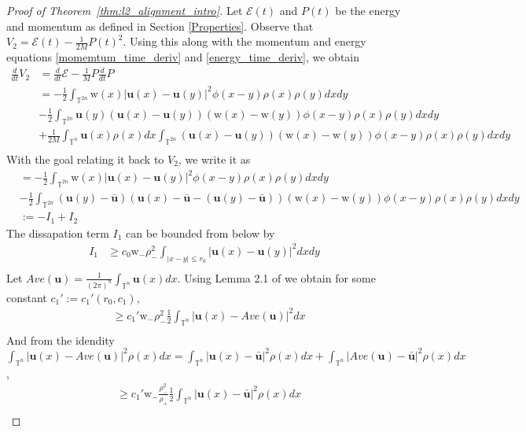 \documentclass[11pt,letterpaper]{amsart}
\theoremstyle{plain}
\theoremstyle{definition}
\theoremstyle{remark}
\newcommand{\thm}[1]{Theorem~\ref{#1}}
\newcommand{\T}{\ensuremath{\mathbb{T}}}   %
\def \cE {\mathcal{E}}
\renewcommand{\geq}{\geqslant}
\renewcommand{\leq}{\leqslant}
\def\T{\mathbb{T}}
\def\u{\textbf{u}}
\def \wt {\mathrm{w}}
\begin{document}
\begin{proof}[Proof of \thm{thm:l2_alignment_intro}]
    Let $\cE(t)$ and $P(t)$ be the energy and momentum as defined in Section \ref{Properties}. 
    Observe that $V_2 = \cE(t) - \frac{1}{2M} P(t)^2$. Using this along with the momentum and energy equations \eqref{momemtum_time_deriv} and \eqref{energy_time_deriv}, 
    we obtain 
    \begin{align*}
        \frac{d}{dt} V_2 &= \frac{d}{dt} \cE - \frac{1}{M} P \frac{d}{dt} P \\
            &= -\frac{1}{2} \int_{\T^{2n}} \wt(x) |\u(x)-\u(y)|^2 \phi(x-y) \rho(x)\rho(y) dx dy \\
            &- \frac{1}{2} \int_{\T^{2n}} \u(y) (\u(x)-\u(y)) (\wt(x)-\wt(y)) \phi(x-y) \rho(x) \rho(y) dx dy \\ 
            &+ \frac{1}{2M} \int_{\T^n} \u(x) \rho(x) dx \int_{\T^{2n}} (\u(x)-\u(y)) (\wt(x)-\wt(y)) \phi(x-y) \rho(x)\rho(y) dx dy  \\
    \end{align*}
    With the goal relating it back to $V_2$, we write it as 
    \begin{align*}
            &= -\frac{1}{2} \int_{\T^{2n}} \wt(x) |\u(x)-\u(y)|^2 \phi(x-y) \rho(x)\rho(y) dx dy \\
            &- \frac{1}{2} \int_{\T^{2n}} (\u(y) - \bar{\u}) (\u(x) - \bar{\u} - (\u(y) - \bar{\u})) (\wt(x)-\wt(y)) \phi(x-y) \rho(x) \rho(y) dx dy \\ 
            &:= -I_1 + I_2 
    \end{align*} 
    The dissapation term $I_1$ can be bounded from below by
    \begin{align*}
        I_1 &\geq c_0 \wt_- \rho_-^2 \int_{|x-y| \leq r_0} |\u(x) - \u(y)|^2 dx dy \\
    \end{align*}
    Let $Ave(\u) = \frac{1}{(2\pi)^n} \int_{\T^n} \u(x) dx$.
    Using Lemma 2.1 of \cite{LS-entropy} we obtain for some constant $c_1' := c_1'(r_0, c_1)$, 
    \begin{align*}
            &\geq c_1' \wt_- \rho_-^2 \frac{1}{2} \int_{\T^n} |\u(x) - Ave(\u)|^2 dx \\
    \end{align*}
    And from the idendity $\int_{\T^n} |\u(x) - Ave(\u)|^2 \rho(x) dx = \int_{\T^n} |\u(x) - \bar{\u}|^2 \rho(x) dx + \int_{\T^n} |Ave(\u) - \bar{\u}|^2 \rho(x) dx$, 
    \begin{align*}
        &\geq c_1' \wt_- \frac{\rho_-^2}{\rho_+} \frac{1}{2} \int_{\T^n} |\u(x) - \bar{\u}|^2 \rho(x) dx \\

\end{align*}
\end{proof}
\end{document}

